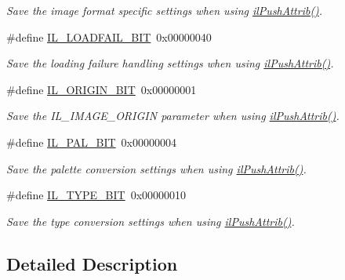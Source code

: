 \begin{DoxyCompactItemize}
\begin{DoxyCompactList}\small\item\em Save the image format specific settings when using \hyperlink{group__state_ga72e0879c71f59f06c35d2e2a10191fa8}{il\+Push\+Attrib()}. \end{DoxyCompactList}\item 
\#define \hyperlink{group__il__bits_gaebba84887b58c8e2152774624b850a5f}{I\+L\+\_\+\+L\+O\+A\+D\+F\+A\+I\+L\+\_\+\+B\+I\+T}~0x00000040
\begin{DoxyCompactList}\small\item\em Save the loading failure handling settings when using \hyperlink{group__state_ga72e0879c71f59f06c35d2e2a10191fa8}{il\+Push\+Attrib()}. \end{DoxyCompactList}\item 
\#define \hyperlink{group__il__bits_ga78b20daea302bfc1d332ac4d2e6cecfb}{I\+L\+\_\+\+O\+R\+I\+G\+I\+N\+\_\+\+B\+I\+T}~0x00000001
\begin{DoxyCompactList}\small\item\em Save the I\+L\+\_\+\+I\+M\+A\+G\+E\+\_\+\+O\+R\+I\+G\+I\+N parameter when using \hyperlink{group__state_ga72e0879c71f59f06c35d2e2a10191fa8}{il\+Push\+Attrib()}. \end{DoxyCompactList}\item 
\#define \hyperlink{group__il__bits_ga9078970cdf80a18b576e0b89a4a8dd22}{I\+L\+\_\+\+P\+A\+L\+\_\+\+B\+I\+T}~0x00000004
\begin{DoxyCompactList}\small\item\em Save the palette conversion settings when using \hyperlink{group__state_ga72e0879c71f59f06c35d2e2a10191fa8}{il\+Push\+Attrib()}. \end{DoxyCompactList}\item 
\#define \hyperlink{group__il__bits_ga52465a50172c85a0c5f86008bd135850}{I\+L\+\_\+\+T\+Y\+P\+E\+\_\+\+B\+I\+T}~0x00000010
\begin{DoxyCompactList}\small\item\em Save the type conversion settings when using \hyperlink{group__state_ga72e0879c71f59f06c35d2e2a10191fa8}{il\+Push\+Attrib()}. \end{DoxyCompactList}\end{DoxyCompactItemize}


\subsection{Detailed Description}


